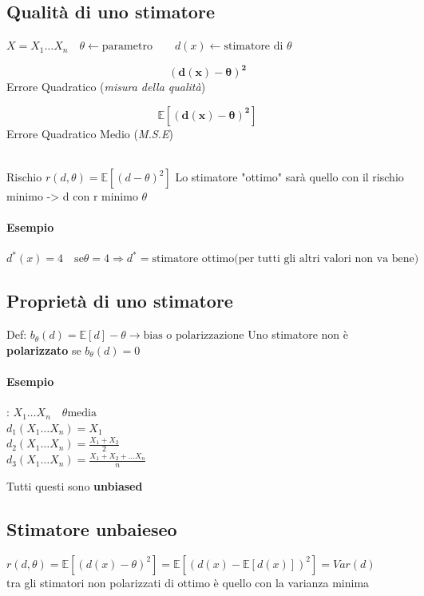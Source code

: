 \documentclass[]{article}
\newcommand{\ev}{\mathbb{E}[X]}
\renewcommand{\ev}[1]{\mathbb{E}\left[#1\right]}
\begin{document}
    \subsection{Qualità di uno stimatore}
    $X = X_1 \ldots X_n \quad \theta \leftarrow \text{parametro} \quad \quad d(x) \leftarrow \text{stimatore di $\theta$}$ \\
    \begin{minipage}{0.5\textwidth}
        \[ \boldsymbol{(d(x) - \theta)^2}\] Errore Quadratico (\textit{misura della qualità})
    \end{minipage}
    \begin{minipage}{0.5\textwidth}
        \[ \boldsymbol{\ev{(d(x)-\theta)^2}} \] Errore Quadratico Medio (\textit{M.S.E})
    \end{minipage} \\
    Rischio $r(d, \theta) = \ev{(d-\theta)^2}$ 
    Lo stimatore "ottimo" sarà quello con il rischio minimo -> d con r minimo $\theta$
    \paragraph{Esempio}
    $d^* (x) = 4 \quad \text{se} \theta = 4 \Rightarrow d^* = \text{stimatore ottimo(per tutti gli altri valori non va bene)}$
    \subsection{Proprietà di uno stimatore}
    Def: $b_\theta(d) = \ev{d} - \theta \rightarrow \text{bias o polarizzazione}$
    Uno stimatore non è \textbf{polarizzato} se $b_\theta(d) = 0$
    \paragraph{Esempio}:
    $X_1 \ldots X_n \quad \theta \text{media}$ \\
    $d_1(X_1 \ldots X_n) = X_1$ \\
    $d_2(X_1 \ldots X_n) = \frac{X_1 + X_2}{2}$ \\
    $d_3(X_1 \ldots X_n) = \frac{X_1 + X_2 + \ldots X_n}{n}$
    \centerline{Tutti questi sono \textbf{unbiased}}
    \subsection{Stimatore unbaieseo}
    $r(d, \theta) = \ev{(d(x) - \theta)^2} = \ev{(d(x) - \ev{d(x)})^2} = Var(d)$ \\
    tra gli stimatori non polarizzati di ottimo è quello con la varianza minima
\end{document}

